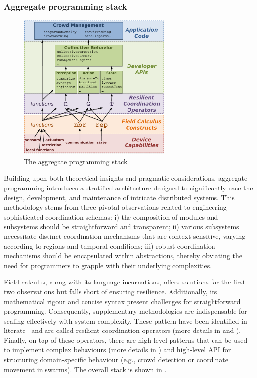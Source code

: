  \subsubsection{Aggregate programming stack}
 \begin{figure}
    \centering
    \includegraphics[width=7.5cm]{chapters/img/aggregate-programming-stack.png}
    \caption{The aggregate programming stack}\label{fig:aggregate-programming-stack}
\end{figure}
Building upon both theoretical insights and pragmatic considerations, 
 aggregate programming introduces a stratified architecture designed to significantly ease the design, development, and maintenance of intricate distributed systems. 
 This methodology stems from three pivotal observations related to engineering sophisticated coordination schemas:
i) the composition of modules and subsystems should be straightforward and transparent;
ii) various subsystems necessitate distinct coordination mechanisms that are context-sensitive, varying according to regions and temporal conditions;
iii) robust coordination mechanisms should be encapsulated within abstractions, thereby obviating the need for programmers to grapple with their underlying complexities.

Field calculus, along with its language incarnations, 
 offers solutions for the first two observations but falls short of ensuring resilience. 
 Additionally, its mathematical rigour and concise syntax present challenges for straightforward programming. 
 Consequently, supplementary methodologies are indispensable for scaling effectively with system complexity.
 These pattern have been identified in literate~\cite{aggregatecomputing} and are called resilient coordination operators (more details in  and ).
 Finally, on top of these operators, there are high-level patterns that can be used to implement complex behaviours (more details in ) and high-level API for structuring domain-specific behaviour (e.g., crowd detection or coordinate movement in swarms).
 The overall stack is shown in .

